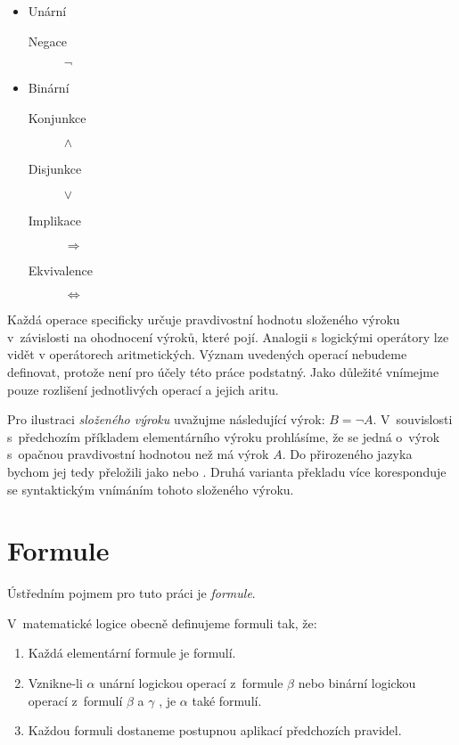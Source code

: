 \documentclass[thesis=B,czech,hidelinks]{FITthesis}[2012/06/26]
\begin{document}
\begin{itemize}
	\item Unární
	\begin{description}
		\item[Negace] $\neg$
	\end{description}
	\item Binární
	\begin{description}
		\item[Konjunkce] $\wedge$
		\item[Disjunkce] $\vee$
		\item[Implikace] $\Rightarrow$
		\item[Ekvivalence] $\Leftrightarrow$
	\end{description}
\end{itemize}

Každá operace specificky určuje pravdivostní hodnotu složeného výroku v~závislosti na ohodnocení výroků, které pojí. Analogii s logickými operátory lze vidět v operátorech aritmetických. Význam uvedených operací nebudeme definovat, protože není pro účely této práce podstatný. Jako důležité vnímejme pouze rozlišení jednotlivých operací a jejich aritu.

\begin{ex}
Pro ilustraci \emph{složeného výroku} uvažujme následující výrok: $B = \neg A$. V~souvislosti s~předchozím příkladem elementárního výroku prohlásíme, že se jedná o~výrok s~opačnou pravdivostní hodnotou než má výrok $A$. Do přirozeného jazyka bychom jej tedy přeložili jako  nebo . Druhá varianta překladu více koresponduje se syntaktickým vnímáním tohoto složeného výroku.
\end{ex}

\section{Formule}

Ústředním pojmem pro tuto práci je \emph{formule}.

\begin{df}
V~matematické logice obecně definujeme formuli tak, že:

\begin{enumerate}
	\item Každá elementární formule je formulí.
	\item Vznikne-li $\alpha$ unární logickou operací z~formule $\beta$ nebo binární logickou operací z~formulí $\beta$ a $\gamma$ , je $\alpha$ také formulí.
	\item Každou formuli dostaneme postupnou aplikací předchozích pravidel\cite{sochor}.
\end{enumerate}
\end{df}
\end{document}
